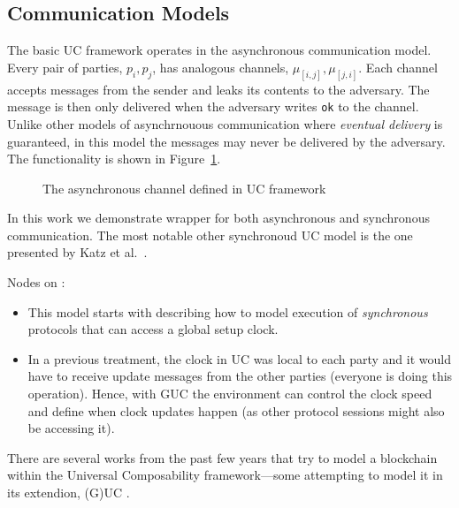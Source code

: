 \subsection{Communication Models}
The basic UC framework operates in the asynchronous communication model.
Every pair of parties, $p_i,p_j$, has analogous channels, $\mu_{[i,j]},\mu_{[j,i]}$.
Each channel accepts messages from the sender and leaks its contents to the adversary.
The message is then only delivered when the adversary writes \texttt{ok} to the channel.
Unlike other models of asynchrnouous communication where \emph{eventual delivery} is guaranteed, in this model the messages may never be delivered by the adversary.
The functionality is shown in Figure~\ref{fig:uc_channel}.

\begin{figure}[h]
	
	\caption{The asynchronous channel defined in UC framework~\cite{uc}}
	\label{fig:uc_channel}
\end{figure}

In this work we demonstrate wrapper for both asynchronous and synchronous communication.
The most notable other synchronoud UC model is the one presented by Katz et al.~\cite{katz-clock}.

\clearpage

Nodes on \cite{kiayias2016fair}:

\begin{itemize}
    \item This model starts with describing how to model execution of \emph{synchronous} protocols that can access a global setup clock.
    \item In a previous treatment, the clock in UC was local to each party and it would have to receive update messages from the other parties (everyone is doing this operation). Hence, with GUC the environment can control the clock speed and define when clock updates happen (as other protocol sessions might also be accessing it).
\end{itemize}

There are several works from the past few years that try to model a blockchain within the Universal Composability framework---some attempting to model it in its extendion, (G)UC \cite{uc, guc}.

